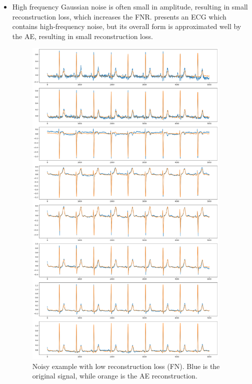 \documentclass[a4paper,10pt]{article}
\begin{document}
\begin{itemize}
	\item High frequency Gaussian noise is often small in amplitude, resulting in small reconstruction loss, which increases the FNR.  presents an ECG which contains high-frequency noise, but its overall form is approximated well by the AE, resulting in small reconstruction loss. 

	\begin{figure}[htbp]
		\centering
		\includegraphics[width=0.93\textwidth]{fn_example.png}
		\caption{Noisy example with low reconstruction loss (FN). Blue is the original signal, while orange is the AE reconstruction.}%
		\label{fig:fn_example}
	\end{figure}


\end{itemize}
\end{document}
